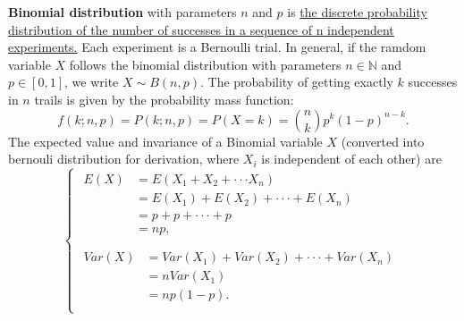 \documentclass[10pt,onecolumn]{book}
\begin{document}
\textbf{Binomial distribution} with parameters $n$ and $p$ is \uline{the discrete probability distribution of the number of successes in a sequence of n independent experiments.} Each experiment is a Bernoulli trial. In general, if the ramdom variable $X$ follows the binomial distribution with parameters $n \in \mathbb{N}$ and $p \in [0, 1]$, we write $X \sim B(n, p)$. The probability of getting exactly $k$ successes in $n$ trails is given by the probability mass function:
\begin{equation}
f(k; n, p) = P(k; n, p) = P(X = k) = \binom{n}{k} p^k (1-p)^{n-k}.
\end{equation}
The expected value and invariance of a Binomial variable $X$ (converted into bernouli distribution for derivation, where $X_{i}$ is independent of each other) are
\begin{equation}\label{eq:binomial_distribution_e_var}
\left\{
	\begin{array}{lr}
	\begin{split}
	E(X)  & = E(X_{1} + X_{2} + \cdot \cdot \cdot X_{n}) \\
		  & = E(X_{1}) + E(X_{2}) + \cdot \cdot \cdot + E(X_{n}) \\
		  & = p + p + \cdot \cdot \cdot + p \\
		  & = np, \\
	\end{split} \\
	\begin{split}
	Var(X) & = Var(X_{1}) + Var(X_{2}) + \cdot \cdot \cdot + Var(X_{n}) \\
		   & = nVar(X_{1}) \\
		   & = np(1-p). \\
	\end{split} 
	\end{array}
\right.
\end{equation}
\end{document}
